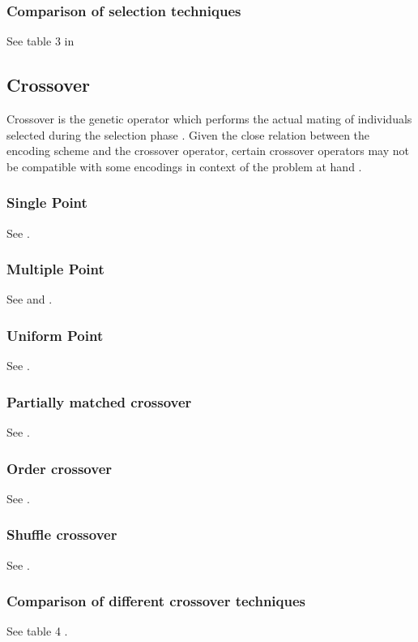\documentclass[sigconf]{acmart}
\begin{document}
\subsubsection{Comparison of selection techniques}
See table 3 in \cite{Katoch2021}

\subsection{Crossover}
Crossover is the genetic operator which performs the actual mating of
individuals selected during the selection phase \cite{Beligiannis2009}.
Given the close relation between the encoding scheme and the crossover operator,
certain crossover operators may not be compatible with some encodings in context
of the problem at hand \cite{Affenzeller2009}.

\subsubsection{Single Point}
See \cite{Affenzeller2009}.

\subsubsection{Multiple Point}
See \cite{Affenzeller2009} and \cite{Katoch2021}.

\subsubsection{Uniform Point}
See \cite{Affenzeller2009}.

\subsubsection{Partially matched crossover}
See \cite{Katoch2021}.

\subsubsection{Order crossover}
See \cite{Katoch2021}.

\subsubsection{Shuffle crossover}
See \cite{Katoch2021}.

\subsubsection{Comparison of different crossover techniques}
See table 4 \cite{Katoch2021}.
\end{document}

